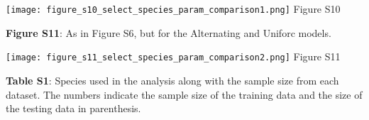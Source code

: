 \documentclass[a4paper,12pt]{article}
\begin{document}
\newpage

\begin{center}
	\centering
		\texttt{[image: figure\_s10\_select\_species\_param\_comparison1.png]}
	Figure S10
\end{center}

\newpage

\textbf{Figure S11}: As in Figure S6, but for the Alternating and Uniforc models. 

\newpage

\begin{center}
	\centering
		\texttt{[image: figure\_s11\_select\_species\_param\_comparison2.png]}
	Figure S11
\end{center}
\newpage

\textbf{Table S1}: Species used in the analysis along with the sample size from each dataset. The numbers indicate the sample size of the training data and the size of the testing data in parenthesis. 

\newpage
\end{document}
